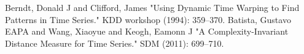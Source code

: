 \documentclass[runningheads,a4paper]{llncs}
\begin{document}


    \begin{thebibliography}{1}
         Berndt, Donald J and Clifford, James "Using Dynamic Time Warping to Find Patterns in
        Time Series." KDD workshop (1994): 359--370.
         Batista, Gustavo EAPA and Wang, Xiaoyue and Keogh, Eamonn J "A
        Complexity-Invariant Distance Measure for Time Series." SDM (2011): 699--710.
    \end{thebibliography}
\end{document}
